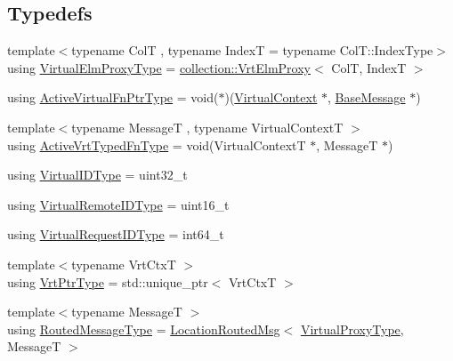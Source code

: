 \subsection*{Typedefs}
\begin{DoxyCompactItemize}
\item 
{\footnotesize template$<$typename ColT , typename IndexT  = typename Col\+T\+::\+Index\+Type$>$ }\\using \hyperlink{namespacevt_1_1vrt_a620a5c8c59d13e513f690c74b4af516f}{Virtual\+Elm\+Proxy\+Type} = \hyperlink{structvt_1_1vrt_1_1collection_1_1_vrt_elm_proxy}{collection\+::\+Vrt\+Elm\+Proxy}$<$ ColT, IndexT $>$
\item 
using \hyperlink{namespacevt_1_1vrt_a8302f182ba4663eee7afc536160d7ef9}{Active\+Virtual\+Fn\+Ptr\+Type} = void($\ast$)(\hyperlink{structvt_1_1vrt_1_1_virtual_context}{Virtual\+Context} $\ast$, \hyperlink{namespacevt_ac34f95a5e2b8109b55bfba52b074443d}{Base\+Message} $\ast$)
\item 
{\footnotesize template$<$typename MessageT , typename Virtual\+ContextT $>$ }\\using \hyperlink{namespacevt_1_1vrt_aaa8f742abd5e7ce91ecceb0957e022a5}{Active\+Vrt\+Typed\+Fn\+Type} = void(Virtual\+ContextT $\ast$, MessageT $\ast$)
\item 
using \hyperlink{namespacevt_1_1vrt_a84d0891f52f70728c3fc2172cffb464b}{Virtual\+I\+D\+Type} = uint32\+\_\+t
\item 
using \hyperlink{namespacevt_1_1vrt_a8184ab8c530ce523edcdc4f4c38565be}{Virtual\+Remote\+I\+D\+Type} = uint16\+\_\+t
\item 
using \hyperlink{namespacevt_1_1vrt_ac7ef8820ebfc383fa16f09bf46eaa2b8}{Virtual\+Request\+I\+D\+Type} = int64\+\_\+t
\item 
{\footnotesize template$<$typename Vrt\+CtxT $>$ }\\using \hyperlink{namespacevt_1_1vrt_a5567b830b7fd81a29e7d3593511721b9}{Vrt\+Ptr\+Type} = std\+::unique\+\_\+ptr$<$ Vrt\+CtxT $>$
\item 
{\footnotesize template$<$typename MessageT $>$ }\\using \hyperlink{namespacevt_1_1vrt_a00a8c6e49603fd62cd0a3fbd99277e36}{Routed\+Message\+Type} = \hyperlink{namespacevt_a0cb65f2151629893480ef391def4e733}{Location\+Routed\+Msg}$<$ \hyperlink{namespacevt_a1b417dd5d684f045bb58a0ede70045ac}{Virtual\+Proxy\+Type}, MessageT $>$
\end{DoxyCompactItemize}
